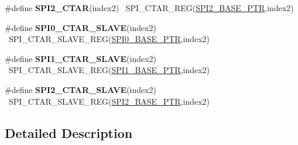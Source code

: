 \begin{DoxyCompactItemize}
\item 
\hypertarget{group___s_p_i___register___accessor___macros_ga92466fc256ea12b3fcc939f006a8725e}{}\#define {\bfseries S\+P\+I2\+\_\+\+C\+T\+A\+R}(index2)                                            ~S\+P\+I\+\_\+\+C\+T\+A\+R\+\_\+\+R\+E\+G(\hyperlink{group___s_p_i___peripheral_ga78714a4b750aa56fc56d1d223a560069}{S\+P\+I2\+\_\+\+B\+A\+S\+E\+\_\+\+P\+T\+R},index2)\label{group___s_p_i___register___accessor___macros_ga92466fc256ea12b3fcc939f006a8725e}

\item 
\hypertarget{group___s_p_i___register___accessor___macros_ga798105887218627609d0e8a5800f3ca9}{}\#define {\bfseries S\+P\+I0\+\_\+\+C\+T\+A\+R\+\_\+\+S\+L\+A\+V\+E}(index2)                                ~S\+P\+I\+\_\+\+C\+T\+A\+R\+\_\+\+S\+L\+A\+V\+E\+\_\+\+R\+E\+G(\hyperlink{group___s_p_i___peripheral_ga851f64a97b5919c1f99a34db5918b3b4}{S\+P\+I0\+\_\+\+B\+A\+S\+E\+\_\+\+P\+T\+R},index2)\label{group___s_p_i___register___accessor___macros_ga798105887218627609d0e8a5800f3ca9}

\item 
\hypertarget{group___s_p_i___register___accessor___macros_ga94ba9eab472c3efa6152378d6c2c8275}{}\#define {\bfseries S\+P\+I1\+\_\+\+C\+T\+A\+R\+\_\+\+S\+L\+A\+V\+E}(index2)                                ~S\+P\+I\+\_\+\+C\+T\+A\+R\+\_\+\+S\+L\+A\+V\+E\+\_\+\+R\+E\+G(\hyperlink{group___s_p_i___peripheral_gae28fd789e0602a32076c1c13ca39f5af}{S\+P\+I1\+\_\+\+B\+A\+S\+E\+\_\+\+P\+T\+R},index2)\label{group___s_p_i___register___accessor___macros_ga94ba9eab472c3efa6152378d6c2c8275}

\item 
\hypertarget{group___s_p_i___register___accessor___macros_gab1b9b840508c9126b4749e73e04e1b62}{}\#define {\bfseries S\+P\+I2\+\_\+\+C\+T\+A\+R\+\_\+\+S\+L\+A\+V\+E}(index2)                                ~S\+P\+I\+\_\+\+C\+T\+A\+R\+\_\+\+S\+L\+A\+V\+E\+\_\+\+R\+E\+G(\hyperlink{group___s_p_i___peripheral_ga78714a4b750aa56fc56d1d223a560069}{S\+P\+I2\+\_\+\+B\+A\+S\+E\+\_\+\+P\+T\+R},index2)\label{group___s_p_i___register___accessor___macros_gab1b9b840508c9126b4749e73e04e1b62}

\end{DoxyCompactItemize}


\subsection{Detailed Description}
